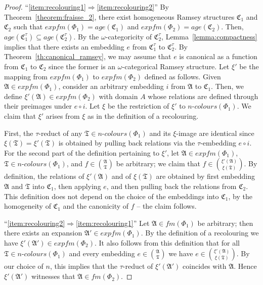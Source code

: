 \documentclass[oneside,reqno,12pt]{amsart}
\theoremstyle{plain}
\theoremstyle{remark}
\newcommand{\struct}[1]{\mathfrak{#1}}
\newcommand{\age}{\ensuremath{\mathit{age}}\xspace}
\newcommand{\fm}{\ensuremath{\mathit{fm}}\xspace}
\newcommand{\efm}{\ensuremath{\mathit{expfm}}\xspace}
\newcommand{\colours}{\ensuremath{n\text{-}\mathit{colours}}}
\begin{document}
{\begin{proof}
``\eqref{item:recolouring1}$\Rightarrow$\eqref{item:recolouring2}''   
By Theorem~\ref{theorem:fraisse_2}, there exist homogeneous Ramsey structures $\struct{C}_1$ and $\struct{C}_2$ such that $\efm(\Phi_1)=\age(\struct{C}_1)$ and $\efm(\Phi_2)=\age(\struct{C}_2)$.
Then, $\age(\struct{C}_1^{\tau}) \subseteq  \age(\struct{C}_2^{\tau})$.
By the $\omega$-categoricity of $\struct{C}_2^{\tau}$,  Lemma~\ref{lemma:compactness} implies that there exists an embedding $e$ from $\struct{C}_1^{\tau}$ to $\struct{C}_2^{\tau}$. 
By Theorem~\ref{th:canonical_ramsey}, we may assume that $e$ is canonical as a function from $\struct{C}_1$ to $\struct{C}_2$ since the former is an $\omega$-categorical Ramsey structure.
Let $\xi'$ be the mapping from $\efm(\Phi_1)$ to $\efm(\Phi_2)$ defined as follows.
Given $\struct{A}\in \efm(\Phi_1)$, consider an arbitrary embedding $i$ from $\struct{A}$ to $\struct{C}_1$.
Then, we define $\xi'(\struct{A}) \in \efm(\Phi_2)$ with domain $A$ whose relations are defined through their preimages under $e\circ i$.   
Let $\xi$ be the restriction of $\xi'$ to $\colours(\Phi_1)$.
We claim that $\xi'$ arises from $\xi$ as in the definition of a recolouring. 

First, the $\tau$-reduct of any   $\struct{T}\in\colours(\Phi_1)$  and its $\xi$-image are identical since $\xi(\struct{T})=\xi'(\struct{T})$ is obtained by pulling back relations via the $\tau$-embedding $e\circ i$.  
For the second part of the definition pertaining to $\xi'$, let $\struct A\in\efm{(\Phi_1)}$, $\struct{T}\in\colours(\Phi_1)$,  and $f\in \binom{\struct A}{\struct{T}}$
be arbitrary; we claim that $f\in \binom{\xi'(\struct A)}{\xi(\struct{T})}$. By definition, the relations of $\xi'(\struct A)$ and of $\xi(\struct{T})$ are obtained by first embedding $\struct A$ and $\struct{T}$  into $\struct{C}_1$, then applying $e$, and then pulling back the relations from $\struct{C}_2$. This definition does not depend on the choice of the embeddings into $\struct{C}_1$, by the homogeneity of  $\struct{C}_1$ and the canonicity of $f$ -- the claim follows. 

``\eqref{item:recolouring2}$\Rightarrow$\eqref{item:recolouring1}''
Let $\struct{A}\in \fm(\Phi_1)$ be arbitrary; then there exists an expansion $\struct{A}'\in \efm(\Phi_1)$. By the definition of a recolouring we have $\xi'(\struct{A}')\in  \efm(\Phi_2)$. It also follows from this definition that  for all $\struct{T} \in \colours(\Phi_1)$ and every embedding $e\in \binom{\struct{A}}{\struct{T}}$ we have $e\in \binom{\xi'(\struct{A})}{\xi(\struct{T})}$. By our choice of $n$, this implies that the $\tau$-reduct of $\xi'(\struct{A}')$ coincides with $\struct A$. Hence $\xi'(\struct{A}')$ witnesses that  $\struct{A}\in \fm(\Phi_2)$.
\end{proof}


}
\end{document}
